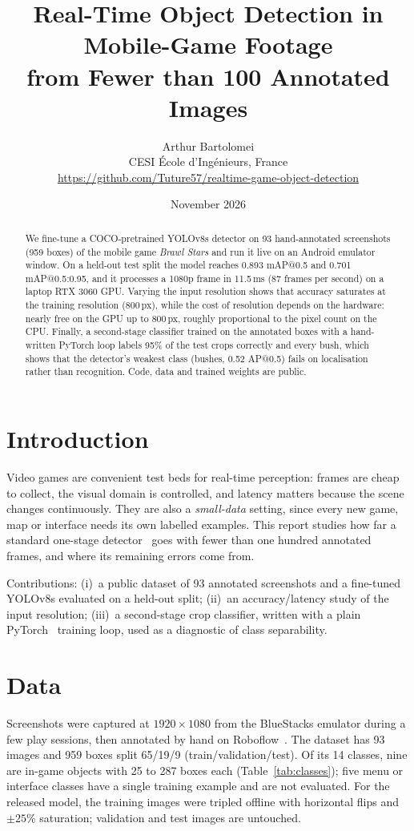 \documentclass[10pt,twocolumn]{article}
\title{Real-Time Object Detection in Mobile-Game Footage\\from Fewer than 100 Annotated Images}
\author{Arthur Bartolomei\\
CESI \'Ecole d'Ing\'enieurs, France\\
\small\url{https://github.com/Tuture57/realtime-game-object-detection}}
\date{November 2026}
\begin{document}
\maketitle

\begin{abstract}
We fine-tune a COCO-pretrained YOLOv8s detector on 93 hand-annotated screenshots (959 boxes) of the mobile
game \emph{Brawl Stars} and run it live on an Android emulator window. On a held-out test split the model
reaches 0.893 mAP@0.5 and 0.701 mAP@0.5:0.95, and it processes a 1080p frame in 11.5\,ms (87 frames per
second) on a laptop RTX 3060 GPU. Varying the input resolution shows that accuracy saturates at the training
resolution (800\,px), while the cost of resolution depends on the hardware: nearly free on the GPU up to
800\,px, roughly proportional to the pixel count on the CPU. Finally, a second-stage classifier trained on the annotated boxes with a hand-written
PyTorch loop labels 95\% of the test crops correctly and every bush, which shows that the detector's weakest
class (bushes, 0.52 AP@0.5) fails on localisation rather than recognition.
Code, data and trained weights are public.
\end{abstract}

\section{Introduction}
Video games are convenient test beds for real-time perception: frames are cheap to collect, the visual
domain is controlled, and latency matters because the scene changes continuously. They are also a
\emph{small-data} setting, since every new game, map or interface needs its own labelled examples.
This report studies how far a standard one-stage detector~\cite{redmon2016yolo,jocher2023yolov8} goes with
fewer than one hundred annotated frames, and where its remaining errors come from.

Contributions: (i)~a public dataset of 93 annotated screenshots and a fine-tuned YOLOv8s evaluated on a
held-out split; (ii)~an accuracy/latency study of the input resolution; (iii)~a second-stage crop classifier,
written with a plain PyTorch~\cite{paszke2019pytorch} training loop, used as a diagnostic of class
separability.

\section{Data}
Screenshots were captured at $1920\times1080$ from the BlueStacks emulator during a few play sessions, then
annotated by hand on Roboflow~\cite{roboflow}. The dataset has 93 images and 959 boxes split 65/19/9
(train/validation/test). Of its 14 classes, nine are in-game objects with 25 to 287 boxes each
(Table~\ref{tab:classes}); five menu or interface classes have a single training example and are not
evaluated. For the released model, the training images were tripled offline with horizontal flips and
$\pm25\%$ saturation; validation and test images are untouched.
\end{document}
